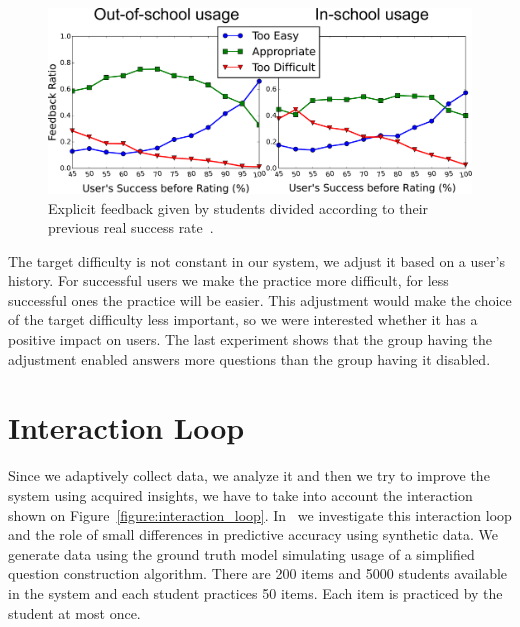 \documentclass[table,color,cover,twoside,nolot,nolof]{fithesis3/fithesis3}
\begin{document}
\begin{figure}[h]
	\begin{center}
		\includegraphics[width=\textwidth]{figure/feedback_by_success_overview}
		\caption{Explicit feedback given by students divided according to their
			previous real success rate~\cite{papousek2015impact}.}
		\label{figure:feedback_by_success}
	\end{center}
\end{figure}

The target difficulty is not constant in our system, we adjust it based on a
user's history. For successful users we make the practice more difficult, for
less successful ones the practice will be easier. This adjustment would make the
choice of the target difficulty less important, so we were interested whether
it has a positive impact on users. The last experiment shows that the group
having the adjustment enabled answers more questions than the group having it
disabled.

\section{Interaction Loop}

Since we adaptively collect data, we analyze it and then we try to improve
the system using acquired insights, we have to take into account the
interaction shown on Figure~\ref{figure:interaction_loop}.
In~\cite{niznan2015exploring} we investigate this interaction loop and the role of
small differences in predictive accuracy using synthetic data. We generate data
using the ground truth model simulating usage of a simplified question
construction algorithm. There are 200 items and 5000 students available in the
system and each student practices 50 items. Each item is practiced by the
student at most once.
\end{document}
